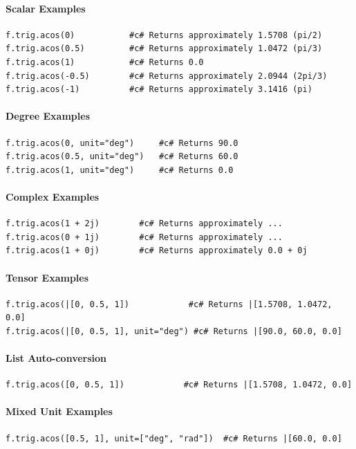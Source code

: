 \paragraph{Scalar Examples}
\begin{verbatim}
f.trig.acos(0)           #c# Returns approximately 1.5708 (pi/2)
f.trig.acos(0.5)         #c# Returns approximately 1.0472 (pi/3)
f.trig.acos(1)           #c# Returns 0.0
f.trig.acos(-0.5)        #c# Returns approximately 2.0944 (2pi/3)
f.trig.acos(-1)          #c# Returns approximately 3.1416 (pi)
\end{verbatim}

\paragraph{Degree Examples}
\begin{verbatim}
f.trig.acos(0, unit="deg")     #c# Returns 90.0
f.trig.acos(0.5, unit="deg")   #c# Returns 60.0
f.trig.acos(1, unit="deg")     #c# Returns 0.0
\end{verbatim}

\paragraph{Complex Examples}
\begin{verbatim}
f.trig.acos(1 + 2j)        #c# Returns approximately ...
f.trig.acos(0 + 1j)        #c# Returns approximately ...
f.trig.acos(1 + 0j)        #c# Returns approximately 0.0 + 0j
\end{verbatim}

\paragraph{Tensor Examples}
\begin{verbatim}
f.trig.acos(|[0, 0.5, 1])            #c# Returns |[1.5708, 1.0472, 0.0]
f.trig.acos(|[0, 0.5, 1], unit="deg") #c# Returns |[90.0, 60.0, 0.0]
\end{verbatim}

\paragraph{List Auto-conversion}
\begin{verbatim}
f.trig.acos([0, 0.5, 1])            #c# Returns |[1.5708, 1.0472, 0.0]
\end{verbatim}

\paragraph{Mixed Unit Examples}
\begin{verbatim}
f.trig.acos([0.5, 1], unit=["deg", "rad"])  #c# Returns |[60.0, 0.0]
\end{verbatim}

